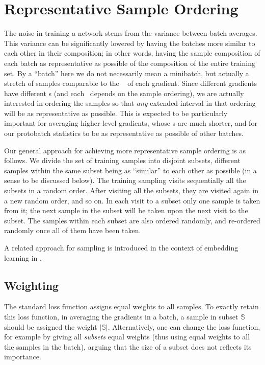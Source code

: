 \documentclass{article} %
\begin{document}
\section{Representative Sample Ordering}
\label{sec:ordering}
The noise in training a network stems from the variance between batch averages. This variance can be significantly lowered by having the batches more similar to each other in their composition; in other words, having the sample composition of each batch as representative as possible of the composition of the entire training set. By a ``batch'' here we do not necessarily mean a minibatch, but actually a stretch of samples comparable to the \NAL~ of each gradient. 
Since different gradients have different {\NAL}s (and each \NAL~depends on the sample ordering), we are actually interested in ordering the samples so that \emph{any} extended interval in that ordering will be as representative as possible. This is expected to be particularly important for averaging higher-level gradients, whose {\NAL}s are much shorter, and for our protobatch statistics to be as representative as possible of other batches. 

Our general approach for achieving more representative sample ordering is as follows. We divide the set of training samples into disjoint subsets, different samples within the same subset being as ``similar'' to each other as possible (in a sense to be discussed below). The training sampling visits sequentially all the subsets in a random order. After visiting all the subsets, they are visited again in a new random order, and so on. In each visit to a subset only one sample is taken from it; the next sample in the subset will be taken upon the next visit to the subset. The samples within each subset are also ordered randomly, and re-ordered randomly once all of them have been taken.

A related approach for sampling is introduced in the context of embedding learning in \cite{WMSK}.

\subsection{Weighting}
The standard loss function assigns equal weights to all samples. To exactly retain this loss function, in averaging the gradients in a batch, a sample in subset $\mathbb{S}$ should be assigned the weight $|\mathbb{S}|$. Alternatively, one can change the loss function, for example by giving all \emph{subsets} equal weights (thus using equal weights to all the samples in the batch), arguing that the size of a subset does not reflects its importance. 
\end{document}
